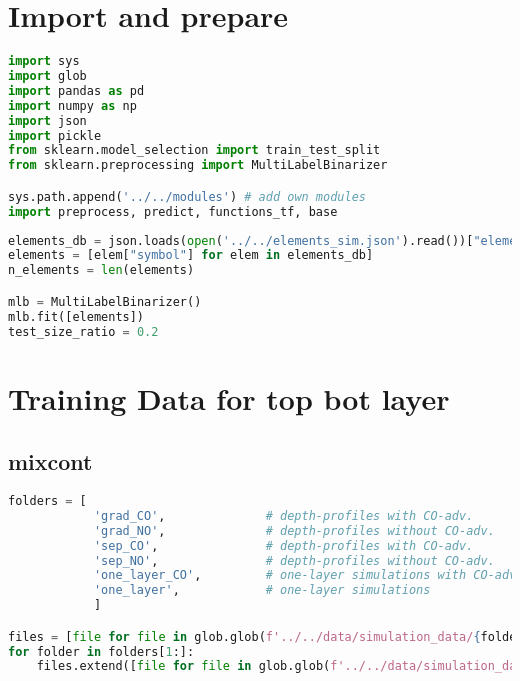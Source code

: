 \hypertarget{import-and-prepare}{%
\section{Import and prepare}\label{import-and-prepare}}

\begin{lstlisting}[language=Python]
import sys
import glob
import pandas as pd
import numpy as np
import json
import pickle
from sklearn.model_selection import train_test_split
from sklearn.preprocessing import MultiLabelBinarizer

sys.path.append('../../modules') # add own modules
import preprocess, predict, functions_tf, base
\end{lstlisting}

\begin{lstlisting}[language=Python]
elements_db = json.loads(open('../../elements_sim.json').read())["elements"]
elements = [elem["symbol"] for elem in elements_db]
n_elements = len(elements)

mlb = MultiLabelBinarizer()
mlb.fit([elements])
test_size_ratio = 0.2
\end{lstlisting}

\hypertarget{training-data-for-top-bot-layer}{%
\section{Training Data for top bot
layer}\label{training-data-for-top-bot-layer}}

\hypertarget{mixcont}{%
\subsection{mixcont}\label{mixcont}}

\begin{lstlisting}[language=Python]
folders = [
            'grad_CO',              # depth-profiles with CO-adv.       with gradient layers
            'grad_NO',              # depth-profiles without CO-adv.    with gradient layers
            'sep_CO',               # depth-profiles with CO-adv.       with separated layers
            'sep_NO',               # depth-profiles without CO-adv.    with separated layers
            'one_layer_CO',         # one-layer simulations with CO-adv.
            'one_layer',            # one-layer simulations
            ]

files = [file for file in glob.glob(f'../../data/simulation_data/{folders[0]}/*.spc')]
for folder in folders[1:]:
    files.extend([file for file in glob.glob(f'../../data/simulation_data/{folder}/*.spc')])
\end{lstlisting}

